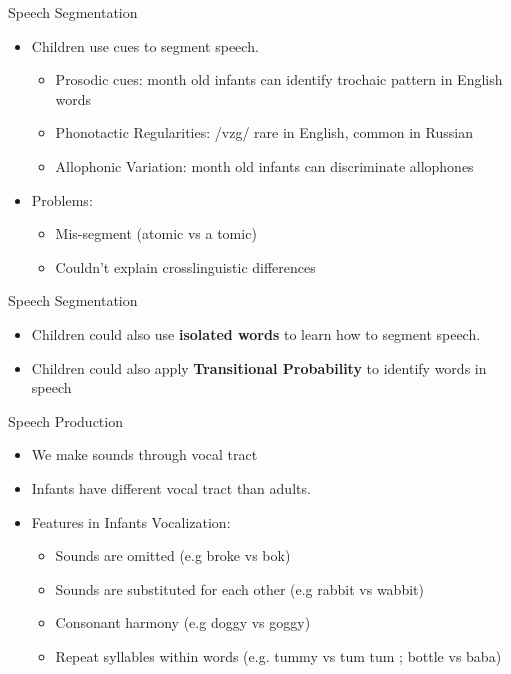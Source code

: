 \documentclass{beamer}
\begin{document}
\begin{frame}{Speech Segmentation}
\begin{itemize}
    \item Children use cues to segment speech.
    \pause
    \begin{itemize}
        \item Prosodic cues:
         month old infants can identify trochaic pattern in English words
        \item Phonotactic Regularities:
        \pause /vzg/ rare in English, common in Russian
        \item Allophonic Variation:
         month old infants can discriminate allophones
    \end{itemize}
    \pause
    \item Problems:
    \begin{itemize}
        \item Mis-segment (atomic vs a tomic)
        \item Couldn't explain crosslinguistic differences
    \end{itemize}
\end{itemize}
\end{frame}
\begin{frame}{Speech Segmentation}
\begin{itemize}
    \item Children could also use 
    \textbf{isolated words} to learn how to segment speech.
    \item Children could also apply \textbf{Transitional Probability} to identify words in speech
\end{itemize}
\end{frame}
\begin{frame}{Speech Production}
\begin{itemize}
    \item We make sounds through vocal tract
    \pause
    \item Infants have different vocal tract than adults.
    \item Features in Infants Vocalization:
    \begin{itemize}
        \item Sounds are omitted (e.g broke vs bok)
        \item Sounds are substituted for each other (e.g rabbit vs wabbit)
        \item Consonant harmony (e.g doggy vs goggy)
        \item Repeat syllables within words (e.g. tummy vs tum tum ; bottle vs baba)
    \end{itemize}
\end{itemize}
\end{frame}
\end{document}
